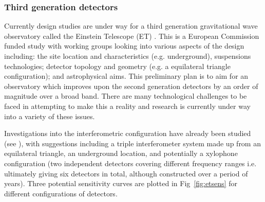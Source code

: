 \documentclass{article}
\begin{document}
\subsubsection{Third generation detectors}
Currently design studies are under way for a third generation gravitational wave
observatory called the Einstein Telescope (ET) \cite{ETweb}. This is a European
Commission funded study with working groups looking into various aspects of the
design including: the site location and characteristics (e.g. underground),
suspensions technologies; detector topology and geometry (e.g. a equilateral
triangle configuration); and astrophysical aims. This preliminary plan is to
aim for an observatory which improves upon the second generation detectors by
an order of magnitude over a broad band. There are many technological challenges
to be faced in attempting to make this a reality and research is currently under
way into a variety of these issues.

Investigations into the interferometric configuration have already been studied
(see \cite{Freise:2008, Hild:2008b, Hild:2010}), with suggestions including a
triple interferometer system made up from an equilateral triangle, an
underground location, and potentially a xylophone configuration (two independent
detectors covering different frequency ranges i.e. ultimately giving six
detectors in total, although constructed over a period of years). Three
potential sensitivity curves are plotted in Fig~\ref{fig:etsens} for different
configurations of detectors.

\end{document}
